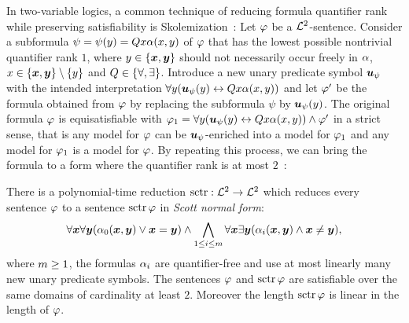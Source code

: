 In two-variable logics, a common technique of reducing formula quantifier rank
while preserving satisfiability is Skolemization~\cite{gradel1999logics}:
Let $\varphi$ be a $\mathcal{L}^{2}$-sentence.
Consider a subformula $\psi = \psi(y) = Qx \alpha(x,y)$ of $\varphi$ that
has the lowest possible nontrivial quantifier rank $1$, where
$y\in\left\{\bm{x},\bm{y}\right\}$ should not necessarily occur freely in $\alpha$, $x \in
\left\{\bm{x},\bm{y}\right\}\setminus\left\{y\right\}$ and $Q \in \left\{\forall,\exists\right\}$.
Introduce a new unary predicate symbol $\bm{u}_{\psi}$ with the intended
interpretation $\forall y(\bm{u}_{\psi}(y) \leftrightarrow Qx \alpha(x,y))$ and
let ${\varphi'}$ be the formula obtained from $\varphi$ by replacing the subformula
$\psi$ by $\bm{u}_{\psi}(y)$.
The original formula $\varphi$ is equisatisfiable with
$\varphi_1 = \forall y(\bm{u}_{\psi}(y) \leftrightarrow Qx \alpha(x,y)) \land
{\varphi'}$ in a strict sense, that is any model for $\varphi$ can be
$\bm{u}_{\psi}$-enriched into a model for $\varphi_1$ and any model for $\varphi_1$ is a
model for $\varphi$.
By repeating this process, we can bring the formula to a form where the
quantifier rank is at most $2$~\cite{scott1962decision,gradel1999logics}:
\begin{theorem}[Scott]
There is a polynomial-time reduction $\operatorname{sctr}: \mathcal{L}^{2} \to \mathcal{L}^{2}$ which reduces
every sentence $\varphi$ to a sentence $\operatorname{sctr}\varphi$ in \emph{Scott normal form}:
\[
  \forall\bm{x}\forall\bm{y}(\alpha_{0}(\bm{x},\bm{y}) \lor \bm{x} = \bm{y}) \land
  \bigwedge_{1 \leq i \leq m} \forall\bm{x}\exists\bm{y}
  (\alpha_{i}(\bm{x},\bm{y}) \land \bm{x} \neq \bm{y}),
\]
where $m\geq1$, the formulas $\alpha_{i}$ are quantifier-free and use at most
linearly many new unary predicate symbols.
The sentences $\varphi$ and $\operatorname{sctr}\varphi$ are satisfiable over the same domains of
cardinality at least $2$.
Moreover the length $\operatorname{sctr}\varphi$ is linear in the length of $\varphi$.
\end{theorem}